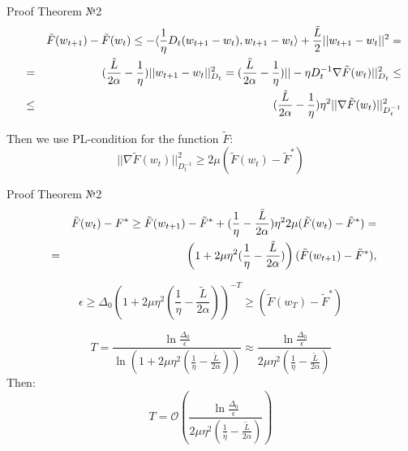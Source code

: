 \documentclass[aspectratio=169, 12pt]{beamer}
\begin{document}
\begin{frame}{Proof Theorem №2}
    \begin{eqnarray*}
    &&
    \tilde{F}(w_{t+1}) - \tilde{F}(w_t) \leq - \langle \frac{1}{\eta} D_t(w_{t+1} - w_t), w_{t+1} - w_t \rangle + \frac{\tilde{L}}{2} ||w_{t+1} - w_t||^2 = 
    \notag\\&\ = &
    (\frac{\tilde{L}}{2 \alpha} - \frac{1}{\eta}) ||w_{t+1} - w_t||^2_{D_t} = (\frac{\tilde{L}}{2 \alpha} - \frac{1}{\eta}) ||-\eta D_t^{-1} \nabla \tilde{F}(w_t)||_{D_t}^2 \leq
    \notag\\&\ \leq &  (\frac{\tilde{L}}{2 \alpha} - \frac{1}{\eta}) \eta^2 ||\nabla \tilde{F}(w_t)||^2_{D_t^{-1}}
    \end{eqnarray*}
    
    Then we use PL-condition for the function $\tilde{F}$:
    \begin{equation*}
        ||\nabla \tilde{F}(w_t)||_{D_t^{-1}}^2 \geq 2 \mu (\tilde{F}(w_t) - \tilde{F}^*)
    \end{equation*}
\end{frame}

\begin{frame}{Proof Theorem №2}
    \begin{eqnarray*}
&& \tilde{F}(w_{t}) -  F^* \ge \tilde{F}(w_{t+1}) - \tilde{F}^* + (\frac{1}{\eta} - \frac{\tilde{L}}{2 \alpha}) \eta^2 2 \mu (\tilde{F}(w_t) - \tilde{F}^*)=
\notag\\&\ = & \left( 1 +  2 \mu \eta^2(\frac{1}{\eta} - \frac{\tilde{L}}{2 \alpha}) \right) (\tilde{F}(w_{t+1}) - \tilde{F}^*),    
\end{eqnarray*}
    
    \begin{equation*}
    \epsilon \ge \Delta_0 \left( 1 +  2 \mu \eta^2(\frac{1}{\eta} - \frac{\tilde{L}}{2 \alpha}) \right)^{-T} \ge (\tilde{F}(w_{T}) - \tilde{F}^*)        
    \end{equation*}

    \begin{equation*}
    T = \frac{\ln \frac{\Delta_0}{\epsilon}}{\ln(1 + 2 \mu \eta^2(\frac{1}{\eta} - \frac{\tilde{L}}{2 \alpha}))} \approx \frac{\ln \frac{\Delta_0}{\epsilon}}{2 \mu \eta^2(\frac{1}{\eta} - \frac{\tilde{L}}{2 \alpha})}        
    \end{equation*}
    Then:
    \begin{equation*}
    T =  \mathcal{O}\left( \frac{\ln \frac{\Delta_0}{\epsilon}}{2 \mu \eta^2(\frac{1}{\eta} - \frac{\tilde{L}}{2 \alpha})} \right)
    \end{equation*}
\end{frame}
\end{document}
